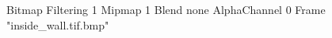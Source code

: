 {Bitmap
	{Filtering 1}
	{Mipmap 1}
	{Blend none}
	{AlphaChannel 0}
	{Frame "inside_wall.tif.bmp"}
}
